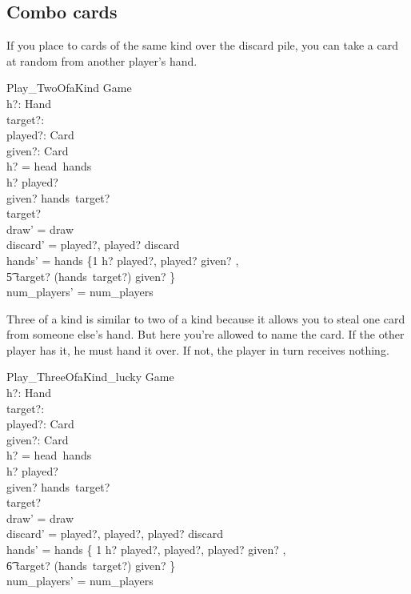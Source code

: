 \documentclass[11pt, fuzz]{article}
\begin{document}
\subsection{Combo cards}

If you place to cards of the same kind over the discard pile, you can take a card at random from another player's hand. 

\begin{schema}{Play\_TwoOfaKind}
    \Delta Game \\
    h?: Hand \\
    target?: \nat \\
    played?: Card \\
    given?: Card \\
\where
    h? = head~hands \\
    h? \bcount played?  \\
    given? \inbag hands~target? \\
    target?  \\
    draw' = draw \\
    discard' = \langle played?, played? \rangle \cat discard \\
    hands' = hands \oplus \{1 \mapsto h? \uminus \lbag played?, played? \rbag \uplus \lbag given? \rbag, \\ \t5 target? \mapsto (hands~target?) \uminus \lbag given? \rbag \} \\
    num\_players' = num\_players
\end{schema}

Three of a kind is similar to two of a kind because it allows you to steal one card from someone else's hand. But here you're allowed to name the card. If the other player has it, he must hand it over. If not, the player in turn receives nothing. 

\begin{schema}{Play\_ThreeOfaKind\_lucky}
    \Delta Game \\
    h?: Hand \\
    target?: \nat \\
    played?: Card \\
    given?: Card \\
\where
    h? = head~hands \\
    h? \bcount played?  \\
    given? \inbag hands~target? \\
    target?  \\
    draw' = draw \\
    discard' = \langle played?, played?, played? \rangle \cat discard \\
    hands' = hands \oplus \{ 1 \mapsto h? \uminus \lbag played?, played?, played? \rbag \uplus \lbag given? \rbag, \\ \t6 target? \mapsto (hands~target?) \uminus \lbag given? \rbag \} \\
    num\_players' = num\_players 
\end{schema}
\end{document}
